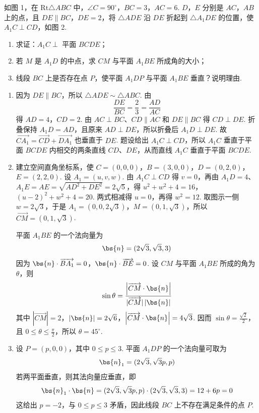 \begin{problem}
如图 1，在 \(\mathrm{Rt}\triangle ABC\) 中，\(\angle C=90^\circ\)，\(BC=3\)，\(AC=6\). \(D\)，\(E\) 分别是 \(AC\)，\(AB\) 上的点，且 \(DE\parallel BC\)，\(DE=2\)，将 \(\triangle ADE\) 沿 \(DE\) 折起到 \(\triangle A_1DE\) 的位置，使 \(A_1C \perp CD\)，如图 2.

\begin{enumerate}
\item 求证：\(A_1C \perp\) 平面 \(BCDE\)；
\item 若 \(M\) 是 \(A_1D\) 的中点，求 \(CM\) 与平面 \(A_1BE\) 所成角的大小；
\item 线段 \(BC\) 上是否存在点 \(P\)，使平面 \(A_1DP\) 与平面 \(A_1BE\) 垂直？说明理由.
\end{enumerate}

\end{problem}

\begin{solution}
\begin{enumerate}
\item 因为 \(DE\parallel BC\)，所以 \(\triangle ADE\sim\triangle ABC\). 由
\[
\frac{DE}{BC}=\frac{2}{3}=\frac{AD}{AC}
\]
得 \(AD=4\)，\(CD=2\). 由 \(AC\perp BC\)、\(CD\parallel AC\) 和 \(DE\parallel BC\) 得 \(CD\perp DE\). 折叠保持 \(A_1D=AD\)，且原来 \(AD\perp DE\)，所以折叠后 \(A_1D\perp DE\). 故 \(\overrightarrow{CA_1}=\overrightarrow{CD}+\overrightarrow{DA_1}\) 也垂直于 \(DE\). 题设给出 \(A_1C\perp CD\)，所以 \(A_1C\) 垂直于平面 \(BCDE\) 内相交的两条直线 \(CD\)、\(DE\)，从而直线 \(A_1C\) 垂直于平面 \(BCDE\).
\item 建立空间直角坐标系，使 \(C=(0,0,0)\)，\(B=(3,0,0)\)，\(D=(0,2,0)\)，\(E=(2,2,0)\). 设 \(A_1=(u,v,w)\). 由 \(A_1C\perp CD\) 得 \(v=0\)，再由 \(A_1D=4\)、\(A_1E=AE=\sqrt{AD^2+DE^2}=2\sqrt5\)，得
\(u^2+w^2+4=16\)，\((u-2)^2+w^2+4=20\).
两式相减得 \(u=0\)，再得 \(w^2=12\). 取图示一侧 \(w=2\sqrt3\)，于是 \(A_1=(0,0,2\sqrt3)\)，\(M=(0,1,\sqrt3)\)，所以 \(\overrightarrow{CM}=(0,1,\sqrt3)\).

平面 \(A_1BE\) 的一个法向量为
\[
\bs{n}=(2\sqrt3,\sqrt3,3)
\]
因为 \(\bs{n}\cdot\overrightarrow{BA_1}=0\)，\(\bs{n}\cdot\overrightarrow{BE}=0\). 设 \(CM\) 与平面 \(A_1BE\) 所成的角为 \(\theta\)，则
\[
\sin\theta=\frac{\left|\overrightarrow{CM}\cdot\bs{n}\right|}{|\overrightarrow{CM}|\,|\bs{n}|}
\]
其中 \(\left|\overrightarrow{CM}\right|=2\)，\(\left|\bs{n}\right|=2\sqrt6\)，\(\left|\overrightarrow{CM}\cdot\bs{n}\right|=4\sqrt3\). 因而 \(\sin\theta=\frac{\sqrt2}{2}\)，且 \(0\leqslant\theta\leqslant\frac{\pi}{2}\)，所以 \(\theta=45^\circ\).
\item 设 \(P=(p,0,0)\)，其中 \(0\leqslant p\leqslant3\). 平面 \(A_1DP\) 的一个法向量可取为
\[
\bs{n}_1=(2\sqrt3,\sqrt3p,p)
\]
若两平面垂直，则其法向量应垂直，即
\[
\bs{n}_1\cdot\bs{n}
=(2\sqrt3,\sqrt3p,p)\cdot(2\sqrt3,\sqrt3,3)
=12+6p=0
\]
这给出 \(p=-2\)，与 \(0\leqslant p\leqslant3\) 矛盾，因此线段 \(BC\) 上不存在满足条件的点 \(P\).
\end{enumerate}
\end{solution}

